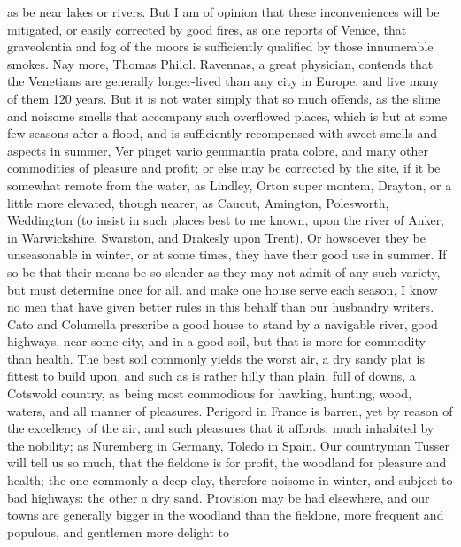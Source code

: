 {as be near lakes or rivers. But I am of opinion that these
inconveniences will be mitigated, or easily corrected by good fires, as
one reports of Venice, that graveolentia and fog of the moors is
sufficiently qualified by those innumerable smokes. Nay more,
Thomas Philol. Ravennas, a great physician, contends that the
Venetians are generally longer-lived than any city in Europe, and live
many of them 120 years. But it is not water simply that so much
offends, as the slime and noisome smells that accompany such overflowed
places, which is but at some few seasons after a flood, and is
sufficiently recompensed with sweet smells and aspects in summer, Ver
pinget vario gemmantia prata colore, and many other commodities of
pleasure and profit; or else may be corrected by the site, if it be
somewhat remote from the water, as Lindley, Orton super montem,
Drayton, or a little more elevated, though nearer, as
Caucut, Amington, Polesworth, Weddington (to
insist in such places best to me known, upon the river of Anker, in
Warwickshire,  Swarston, and Drakesly upon Trent). Or
howsoever they be unseasonable in winter, or at some times, they have
their good use in summer. If so be that their means be so slender as
they may not admit of any such variety, but must determine once for
all, and make one house serve each season, I know no men that have
given better rules in this behalf than our husbandry writers.
Cato and Columella prescribe a good house to stand by a navigable
river, good highways, near some city, and in a good soil, but that is
more for commodity than health.
The best soil commonly yields the worst air, a dry sandy plat is
fittest to build upon, and such as is rather hilly than plain, full of
downs, a Cotswold country, as being most commodious for hawking,
hunting, wood, waters, and all manner of pleasures. Perigord in France
is barren, yet by reason of the excellency of the air, and such
pleasures that it affords, much inhabited by the nobility; as Nuremberg
in Germany, Toledo in Spain. Our countryman Tusser will tell us so
much, that the fieldone is for profit, the woodland for pleasure and
health; the one commonly a deep clay, therefore noisome in winter, and
subject to bad highways: the other a dry sand. Provision may be had
elsewhere, and our towns are generally bigger in the woodland than the
fieldone, more frequent and populous, and gentlemen more delight to
}
